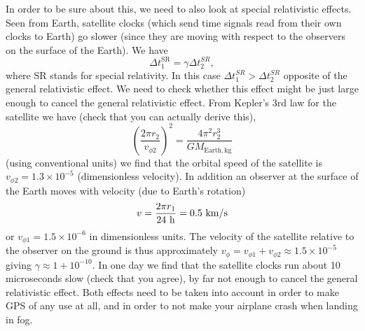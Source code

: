 {\begin{multicols}{2}
In order to be sure about this, we need to also look at special relativistic effects. Seen from Earth, satellite clocks (which send time signals read from their own clocks to Earth) go slower (since they are moving with respect to the observers on the surface of the Earth). We have
\[
\Delta t_1^\mathrm{SR}=\gamma\Delta t_2^{SR},
\]
where SR stands for special relativity. In this case $\Delta t_1^{SR}>\Delta t_2^{SR}$ opposite of the general relativistic effect. We need to check whether this effect might be just large enough to cancel the general relativistic effect. From Kepler's 3rd law for the satellite we have (check that you can actually derive this), 
\[
\left(\frac{2\pi r_2}{v_{\phi2}}\right)^2=\frac{4\pi^2 r_2^3}{GM_\mathrm{Earth,kg}}
\]
(using conventional units) we find that the orbital speed of the satellite is $v_{\phi2}=1.3\times10^{-5}$ (dimensionless velocity). In addition an observer at the surface of the Earth moves with velocity (due to Earth's rotation)
\[
v=\frac{2\pi r_1}{24{\rm\ h}}=0.5{\rm\ km/s}
\]
or $v_{\phi1}=1.5\times10^{-6}$ in dimensionless units. The velocity of the satellite relative to the observer on the ground is thus approximately $v_{\phi}=v_{\phi1}+v_{\phi2}\approx1.5\times10^{-5}$ giving $\gamma\approx1+10^{-10}$. In one day we find that the satellite clocks run about 10 microseconds slow (check that you agree), by far not enough to cancel the general relativistic effect. Both effects need to be taken into account in order to make GPS of any use at all, and in order to not make your airplane crash when landing in fog.


\end{multicols}}
